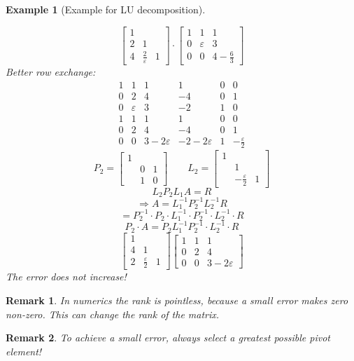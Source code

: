 \documentclass[a4paper,landscape,twocolumn]{article}
\newtheorem{ex}{Example}
\newtheorem{rem}{Remark}
\begin{document}
\begin{ex}[Example for LU decomposition]
\begin{itemize}
\[\begin{bmatrix}
          1 &   & \\
          2 & 1 & \\
          4 & \frac2{\varepsilon} & 1
        \end{bmatrix} \cdot \begin{bmatrix}
          1 & 1 & 1 \\
          0 & \varepsilon & 3 \\
          0 & 0 & 4-\frac63
        \end{bmatrix}
      \]
      Better row exchange:
      \[
        \begin{array}{ccc|ccc}
          1 & 1 & 1 & 1 & 0 & 0 \\
          0 & 2 & 4 & -4 & 0 & 1 \\
          0 & \varepsilon & 3 & -2 & 1 & 0 \\
        \hline
          1 & 1 & 1 & 1 & 0 & 0 \\
          0 & 2 & 4 & -4 & 0 & 1 \\
          0 & 0 & 3-2\varepsilon & -2-2\varepsilon & 1 & -\frac\varepsilon2
        \end{array}
      \] \[
        P_2 = \begin{bmatrix}
         1 &   & \\
           & 0 & 1 \\
           & 1 & 0
        \end{bmatrix}
        \qquad
        L_2 = \begin{bmatrix}
          1 &   &  \\
            & 1 &  \\
            & -\frac\varepsilon2 & 1
        \end{bmatrix}
      \] \[
        L_2 P_2 L_1 A = R
      \] \[
        \Rightarrow A = L_1^{-1} P_2^{-1} L_2^{-1} R
      \] \[
        = P_2^{-1} \cdot P_2 \cdot L_1^{-1} \cdot P_2^{-1} \cdot L_2^{-1} \cdot R
      \] \[
        P_2 \cdot A = P_2 L_1^{-1} P_2^{-1} \cdot L_2^{-1} \cdot R
      \] \[
        \begin{bmatrix}
          1 &   & \\
          4 & 1 & \\
          2 & \frac\varepsilon2 & 1
        \end{bmatrix}
        \begin{bmatrix}
          1 & 1 & 1 \\
          0 & 2 & 4 \\
          0 & 0 & 3-2\varepsilon
        \end{bmatrix}
      \]
      The error does not increase!
  \end{itemize}
\end{ex}
\begin{rem}
  In numerics the rank is pointless, because a small error makes zero non-zero.
  This can change the rank of the matrix.
\end{rem}
\begin{rem}
  To achieve a small error, always select a greatest possible pivot element!
\end{rem}
\end{document}
